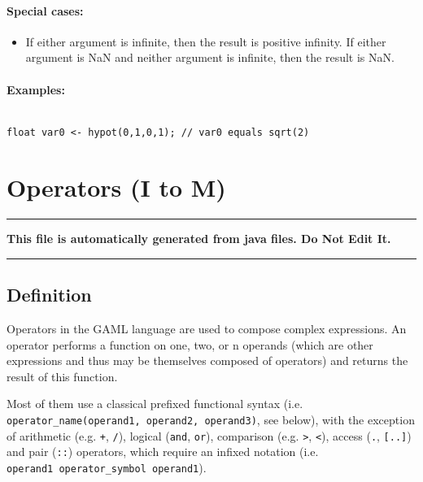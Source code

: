 \documentclass[]{book}
\providecommand{\tightlist}{%
  \setlength{\itemsep}{0pt}\setlength{\parskip}{0pt}}
\theoremstyle{definition}
\theoremstyle{definition}
\theoremstyle{definition}
\theoremstyle{remark}
\begin{document}
\subsubsection{Special cases:}\label{special-cases-76}

\begin{itemize}
\tightlist
\item
  If either argument is infinite, then the result is positive infinity.
  If either argument is NaN and neither argument is infinite, then the
  result is NaN.
\end{itemize}

\subsubsection{Examples:}\label{examples-201}

\begin{verbatim}
 
float var0 <- hypot(0,1,0,1); // var0 equals sqrt(2)
\end{verbatim}

\chapter{Operators (I to M)}\label{operators-i-to-m}

\begin{center}\rule{0.5\linewidth}{\linethickness}\end{center}

\textbf{This file is automatically generated from java files. Do Not
Edit It.}

\begin{center}\rule{0.5\linewidth}{\linethickness}\end{center}

\section{Definition}\label{definition-3}

Operators in the GAML language are used to compose complex expressions.
An operator performs a function on one, two, or n operands (which are
other expressions and thus may be themselves composed of operators) and
returns the result of this function.

Most of them use a classical prefixed functional syntax (i.e.
\texttt{operator\_name(operand1,\ operand2,\ operand3)}, see below),
with the exception of arithmetic (e.g. \texttt{+}, \texttt{/}), logical
(\texttt{and}, \texttt{or}), comparison (e.g. \texttt{\textgreater{}},
\texttt{\textless{}}), access (\texttt{.}, \texttt{{[}..{]}}) and pair
(\texttt{::}) operators, which require an infixed notation (i.e.
\texttt{operand1\ operator\_symbol\ operand1}).
\end{document}
